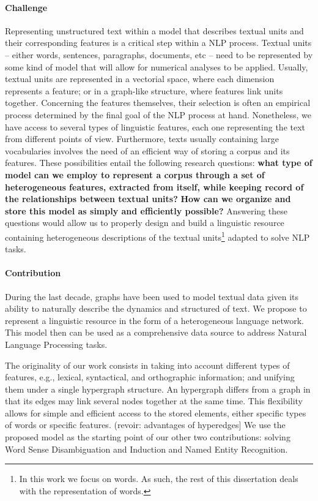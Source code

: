 \paragraph{Challenge}
Representing unstructured text within a model that describes textual units and their corresponding features is a critical step within a NLP process. Textual units -- either words, sentences, paragraphs, documents, etc -- need to be represented by some kind of model that will allow for numerical analyses to be applied. Usually, textual units are represented in a vectorial space, where each dimension represents a feature; or in a graph-like structure, where features link units together. Concerning the features themselves, their selection is often an empirical process determined  by the final goal of the NLP process at hand. Nonetheless,  we have access to several types of linguistic features, each one representing the text from different points of view.  Furthermore, texts usually containing large vocabularies involves the need of an efficient way of storing a corpus and its features. These possibilities entail the following research questions: \textbf{what type of model can we employ to represent a corpus through a set of heterogeneous features, extracted from itself, while keeping record of the relationships between textual units?} \textbf{How can we organize and store this model as simply and efficiently possible?} Answering these questions would allow us to  properly design and build a linguistic resource containing heterogeneous descriptions of the textual units\footnote{In this work we focus on words. As such, the rest of this dissertation deals with the representation of words.} adapted to solve NLP tasks.


\paragraph{Contribution}

During the last decade, graphs have been used to model textual data given its ability to naturally describe the dynamics and structured of text. We propose to represent a linguistic resource in the form of a heterogeneous language network. This model then can be used as a comprehensive data source to address Natural Language Processing tasks. 

The originality of our work consists in taking into account different types of features, e.g., lexical, syntactical, and orthographic information; and unifying them under a single hypergraph structure. An hypergraph differs from a graph in that its edges may link several nodes together at the same time. This flexibility allows for simple and efficient access to the stored elements, either specific types of words or specific features. (revoir: advantages of hyperedges]
%
We use the proposed model as the starting point of our other two contributions: solving Word Sense Disambiguation and Induction and Named Entity Recognition. 

